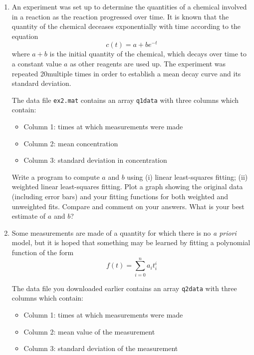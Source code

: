 \documentclass[12pt,a4paper]{tufte-handout}
\begin{document}
\begin{enumerate}
  \item An experiment was set up to determine the quantities of a chemical involved in a reaction as the reaction progressed over time. It is known that the quantity of the chemical deceases exponentially with time according to the equation
    \begin{equation*}
      c(t) = a + be^{-t}
    \end{equation*}
    where $a+b$ is the initial quantity of the chemical, which decays over time to a constant value $a$ as other reagents are used up. The experiment was repeated 20multiple times in order to establish a mean decay curve and its standard deviation.

    The data file \texttt{ex2.mat} contains an array \texttt{q1data} with three columns which contain:
    \begin{itemize}
    \item Column 1: times at which measurements were made
    \item Column 2: mean concentration
    \item Column 3: standard deviation in concentration
    \end{itemize}

    Write a program to compute $a$ and $b$ using (i) linear least-squares fitting; (ii) weighted linear least-squares fitting. Plot a graph showing the original data (including error bars) and your fitting functions for both weighted and unweighted fits. Compare and comment on your answers. What is your best estimate of $a$ and $b$? 


    \item Some measurements are made of a quantity for which there is no \textit{a priori} model, but it is hoped that something may be learned by fitting a polynomial function of the form
      \begin{equation*}
        f(t)=\sum_{i=0}^n a_i t_i^i
      \end{equation*}
      
      The data file you downloaded earlier contains an array \texttt{q2data} with three columns which contain:
      \begin{itemize}
      \item Column 1: times at which measurements were made
      \item Column 2: mean value of the measurement
      \item Column 3: standard deviation of the measurement
      \end{itemize}
      

\end{enumerate}
\end{document}
